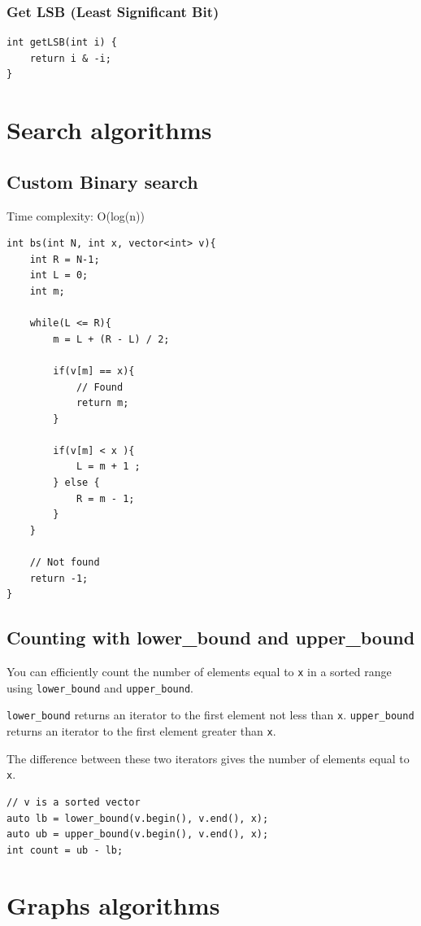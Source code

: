 \documentclass[10pt]{article}
\begin{document}
\begin{multicols*}{2}
\subsubsection{Get LSB (Least Significant Bit)}
\begin{lstlisting}[style=compactcpp]
int getLSB(int i) {
    return i & -i;
}
\end{lstlisting}

\section{Search algorithms}

\subsection{Custom Binary search}
Time complexity: O(log(n))
\begin{lstlisting}[style=compactcpp]
int bs(int N, int x, vector<int> v){
    int R = N-1;
    int L = 0;
    int m;

    while(L <= R){
        m = L + (R - L) / 2;

        if(v[m] == x){
            // Found
            return m;
        }

        if(v[m] < x ){
            L = m + 1 ;
        } else {
            R = m - 1;
        }
    }

    // Not found
    return -1;
}
\end{lstlisting}

\subsection{Counting with lower\_bound and upper\_bound}
You can efficiently count the number of elements equal to \texttt{x} in a sorted range using \texttt{lower\_bound} and \texttt{upper\_bound}.

\texttt{lower\_bound} returns an iterator to the first element not less than \texttt{x}.
\texttt{upper\_bound} returns an iterator to the first element greater than \texttt{x}.

The difference between these two iterators gives the number of elements equal to \texttt{x}.
\begin{lstlisting}[style=compactcpp]
// v is a sorted vector
auto lb = lower_bound(v.begin(), v.end(), x);
auto ub = upper_bound(v.begin(), v.end(), x);
int count = ub - lb;
\end{lstlisting}

\section{Graphs algorithms}


\end{multicols*}
\end{document}

